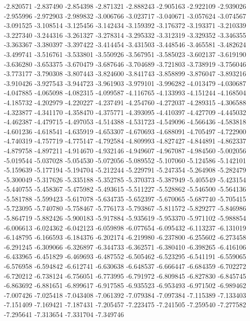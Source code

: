 -2.820571
-2.837490
-2.854398
-2.871321
-2.888243
-2.905163
-2.922109
-2.939026
-2.955996
-2.972903
-2.989832
-3.006766
-3.023717
-3.040671
-3.057624
-3.074567
-3.091525
-3.108514
-3.125456
-3.142434
-3.159392
-3.176372
-3.193371
-3.210339
-3.227340
-3.244316
-3.261327
-3.278314
-3.295332
-3.312319
-3.329352
-3.346355
-3.363367
-3.380397
-3.397422
-3.414454
-3.431503
-3.448546
-3.465581
-3.482624
-3.499741
-3.516761
-3.533801
-3.550926
-3.567951
-3.585023
-3.602137
-3.619190
-3.636280
-3.653375
-3.670479
-3.687646
-3.704689
-3.721803
-3.738919
-3.756046
-3.773177
-3.790308
-3.807443
-3.824600
-3.841743
-3.858899
-3.876047
-3.893216
-3.910426
-3.927543
-3.944723
-3.961903
-3.979101
-3.996282
-4.013479
-4.030687
-4.047885
-4.065098
-4.082315
-4.099587
-4.116765
-4.133993
-4.151244
-4.168504
-4.185732
-4.202979
-4.220227
-4.237491
-4.254760
-4.272037
-4.289315
-4.306588
-4.323877
-4.341170
-4.358470
-4.375771
-4.393095
-4.410397
-4.427709
-4.445032
-4.462387
-4.479715
-4.497053
-4.514388
-4.531723
-4.549096
-4.566436
-4.583818
-4.601236
-4.618541
-4.635919
-4.653307
-4.670693
-4.688091
-4.705497
-4.722900
-4.740319
-4.757719
-4.775147
-4.792584
-4.809993
-4.827427
-4.844891
-4.862337
-4.879758
-4.897211
-4.914670
-4.932146
-4.949607
-4.967087
-4.984560
-5.002056
-5.019544
-5.037028
-5.054530
-5.072056
-5.089552
-5.107060
-5.124586
-5.142101
-5.159639
-5.177194
-5.194704
-5.212244
-5.229791
-5.247354
-5.264908
-5.282479
-5.300049
-5.317626
-5.335188
-5.352785
-5.370373
-5.387949
-5.405549
-5.423154
-5.440755
-5.458367
-5.475982
-5.493615
-5.511227
-5.528862
-5.546500
-5.564136
-5.581788
-5.599423
-5.617078
-5.634735
-5.652397
-5.670065
-5.687740
-5.705415
-5.723095
-5.740780
-5.758467
-5.776173
-5.793867
-5.811572
-5.829277
-5.846986
-5.864719
-5.882426
-5.900183
-5.917884
-5.935619
-5.953370
-5.971102
-5.988854
-6.006613
-6.024362
-6.042123
-6.059898
-6.077654
-6.095432
-6.113237
-6.131019
-6.148795
-6.166593
-6.184376
-6.202174
-6.219980
-6.237800
-6.255602
-6.273458
-6.291245
-6.309066
-6.326897
-6.344733
-6.362571
-6.380410
-6.398265
-6.416106
-6.433965
-6.451829
-6.469693
-6.487552
-6.505462
-6.523295
-6.541191
-6.559065
-6.576958
-6.594842
-6.612741
-6.630638
-6.648537
-6.666447
-6.684359
-6.702272
-6.720212
-6.738124
-6.756051
-6.773995
-6.791972
-6.809845
-6.827830
-6.845745
-6.863692
-6.881651
-6.899617
-6.917585
-6.935523
-6.953493
-6.971502
-6.989462
-7.007426
-7.025418
-7.043408
-7.061392
-7.079384
-7.097384
-7.115389
-7.133403
-7.151409
-7.169421
-7.187431
-7.205457
-7.223475
-7.241505
-7.259540
-7.277582
-7.295641
-7.313654
-7.331704
-7.349746
